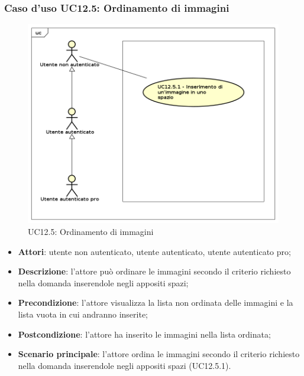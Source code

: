 \subsubsection{Caso d'uso UC12.5: Ordinamento di immagini}
\label{UC12.5}
\begin{figure}[h]
	\centering
	\includegraphics[scale=0.5]{UML/UC12_5.png}
	\caption{UC12.5: Ordinamento di immagini}
\end{figure}
\begin{itemize}
\item \textbf{Attori}: utente non autenticato, utente autenticato, utente autenticato pro;
\item \textbf{Descrizione}: l'attore può ordinare le immagini secondo il criterio richiesto nella domanda inserendole negli appositi spazi;
\item \textbf{Precondizione}: l'attore visualizza la lista non ordinata delle immagini e la lista vuota in cui andranno inserite;
\item \textbf{Postcondizione}: l'attore ha inserito le immagini nella lista ordinata;
\item \textbf{Scenario principale}: l'attore ordina le immagini secondo il criterio richiesto nella domanda inserendole negli appositi spazi (UC12.5.1).
\end{itemize}

\newpage
